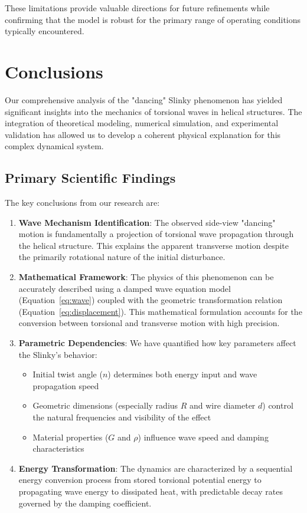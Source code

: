 \documentclass{mcmthesis}  %
\begin{document}
These limitations provide valuable directions for future refinements while confirming that the model is robust for the primary range of operating conditions typically encountered.

\section{Conclusions}  %

Our comprehensive analysis of the "dancing" Slinky phenomenon has yielded significant insights into the mechanics of torsional waves in helical structures. The integration of theoretical modeling, numerical simulation, and experimental validation has allowed us to develop a coherent physical explanation for this complex dynamical system.

\subsection{Primary Scientific Findings}
The key conclusions from our research are:

\begin{enumerate}
    \item \textbf{Wave Mechanism Identification}: The observed side-view "dancing" motion is fundamentally a projection of torsional wave propagation through the helical structure. This explains the apparent transverse motion despite the primarily rotational nature of the initial disturbance.
    
    \item \textbf{Mathematical Framework}: The physics of this phenomenon can be accurately described using a damped wave equation model (Equation~\ref{eq:wave}) coupled with the geometric transformation relation (Equation~\ref{eq:displacement}). This mathematical formulation accounts for the conversion between torsional and transverse motion with high precision.
    
    \item \textbf{Parametric Dependencies}: We have quantified how key parameters affect the Slinky's behavior:
    \begin{itemize}
        \item Initial twist angle ($n$) determines both energy input and wave propagation speed
        \item Geometric dimensions (especially radius $R$ and wire diameter $d$) control the natural frequencies and visibility of the effect
        \item Material properties ($G$ and $\rho$) influence wave speed and damping characteristics
    \end{itemize}
    
    \item \textbf{Energy Transformation}: The dynamics are characterized by a sequential energy conversion process from stored torsional potential energy to propagating wave energy to dissipated heat, with predictable decay rates governed by the damping coefficient.
\end{enumerate}
\end{document}
